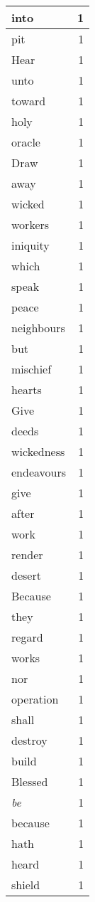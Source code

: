 \begin{center}
\begin{longtable}{l|r}
into & 1 \\ \hline
pit & 1 \\ \hline
Hear & 1 \\ \hline
unto & 1 \\ \hline
toward & 1 \\ \hline
holy & 1 \\ \hline
oracle & 1 \\ \hline
Draw & 1 \\ \hline
away & 1 \\ \hline
wicked & 1 \\ \hline
workers & 1 \\ \hline
iniquity & 1 \\ \hline
which & 1 \\ \hline
speak & 1 \\ \hline
peace & 1 \\ \hline
neighbours & 1 \\ \hline
but & 1 \\ \hline
mischief & 1 \\ \hline
hearts & 1 \\ \hline
Give & 1 \\ \hline
deeds & 1 \\ \hline
wickedness & 1 \\ \hline
endeavours & 1 \\ \hline
give & 1 \\ \hline
after & 1 \\ \hline
work & 1 \\ \hline
render & 1 \\ \hline
desert & 1 \\ \hline
Because & 1 \\ \hline
they & 1 \\ \hline
regard & 1 \\ \hline
works & 1 \\ \hline
nor & 1 \\ \hline
operation & 1 \\ \hline
shall & 1 \\ \hline
destroy & 1 \\ \hline
build & 1 \\ \hline
Blessed & 1 \\ \hline
\emph{be} & 1 \\ \hline
because & 1 \\ \hline
hath & 1 \\ \hline
heard & 1 \\ \hline
shield & 1 \\ \hline

\end{longtable}
\end{center}
